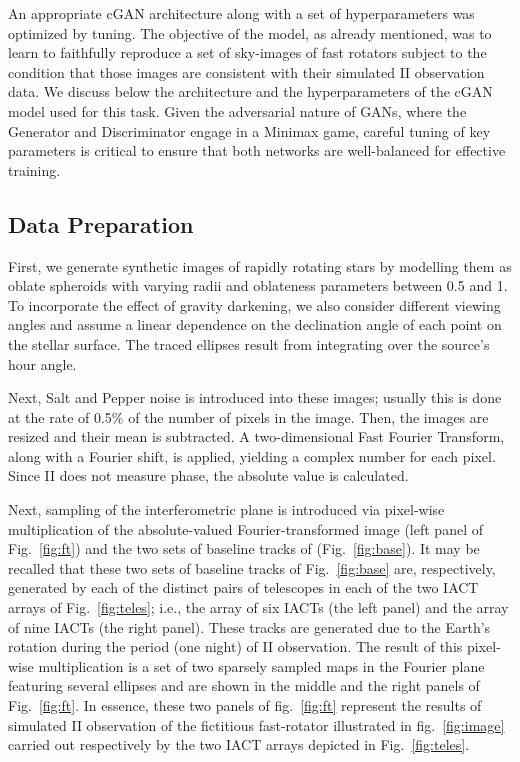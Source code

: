 An appropriate cGAN architecture along with a set of hyperparameters was optimized by tuning. The objective of the model, as already mentioned, was to learn to faithfully reproduce a set of sky-images of fast rotators subject to the condition that those images are consistent with their simulated II observation data. We discuss below the architecture and the hyperparameters of the cGAN model used for this task. Given the adversarial nature of GANs, where the Generator and Discriminator engage in a Minimax game, careful tuning of key parameters is critical to ensure that both networks are well-balanced for effective training.


\subsection{Data Preparation}\label{sec:DataPrep}
First, we generate synthetic images of rapidly rotating stars by modelling them as oblate spheroids with varying radii and oblateness parameters between 0.5 and 1. To incorporate the effect of gravity darkening, we also consider different viewing angles and assume a linear dependence on the declination angle of each point on the stellar surface. The traced ellipses result from integrating over the source's hour angle.

Next, Salt and Pepper noise is introduced into these images; usually this is done at the rate of 0.5\% of the number of pixels in the image. Then, the images are resized and their mean is subtracted. A two-dimensional Fast Fourier Transform, along with a Fourier shift, is applied, yielding a complex number for each pixel. Since II does not measure phase, the absolute value is calculated. 

Next, sampling of the interferometric plane is introduced via pixel-wise multiplication of the absolute-valued Fourier-transformed image (left panel of Fig.~\ref{fig:ft}) and the two sets of baseline tracks of (Fig.~\ref{fig:base}). It may be recalled that these two sets of baseline tracks of Fig.~\ref{fig:base} are, respectively, generated by each of the distinct pairs of telescopes in each of the two IACT arrays of Fig.~\ref{fig:teles}; i.e., the array of six IACTs (the left panel) and the array of nine IACTs (the right panel). These tracks are generated due to the Earth's rotation during the period (one night) of II observation. The result of this pixel-wise multiplication is a set of two sparsely sampled maps in the Fourier plane featuring several ellipses and are shown in the middle and the right panels of Fig.~\ref{fig:ft}. In essence, these two panels of fig.~\ref{fig:ft} represent the results of simulated II observation of the fictitious fast-rotator illustrated in fig.~\ref{fig:image} carried out respectively by the two IACT arrays depicted in Fig.~\ref{fig:teles}.

